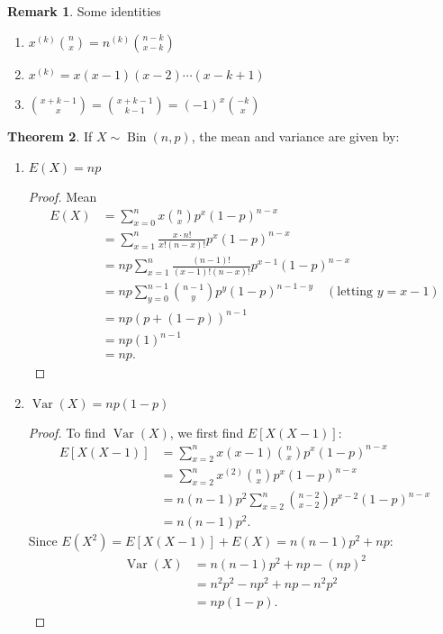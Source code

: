 \documentclass[12pt,a4paper]{report}
\theoremstyle{definition}
\newtheorem{thm}{Theorem}[section]
\newtheorem{remark}[thm]{Remark}
\theoremstyle{plain}
\theoremstyle{definition}
\begin{document}
\begin{remark}
Some identities
\begin{enumerate}
\item $x^{(k)}\binom{n}{x} = n^{(k)}\binom{n-k}{x-k}$
\item $x^{(k)} = x(x - 1)(x - 2) \cdots (x - k + 1)$
\item $\binom{x + k - 1}{x} = \binom{x + k - 1}{k - 1} = (-1)^x\binom{-k}{x}$
\end{enumerate}
\end{remark}






\begin{thm}
If $X \sim \operatorname{Bin}(n, p)$, the mean and variance are given by:
\begin{enumerate}
\item $E(X) = np$
\begin{proof}
Mean 
\begin{align*} 
E(X) &= \sum_{x=0}^n x \binom{n}{x} p^x (1-p)^{n-x}\\
& = \sum_{x=1}^n \frac{x \cdot n!}{x!(n-x)!} p^x (1-p)^{n-x}\\ 
& = np \sum_{x=1}^n \frac{(n-1)!}{(x-1)!(n-x)!} p^{x-1} (1-p)^{n-x}\\ 
& = np \sum_{y=0}^{n-1} \binom{n-1}{y} p^y (1-p)^{n-1-y} \quad (\text{letting } y = x-1)\\ 
& = np(p + (1-p))^{n-1}\\
& = np(1)^{n-1}\\
& = np. 
\end{align*}
\end{proof}


\item $\operatorname{Var}(X) = np(1-p)$
\begin{proof}
To find $\operatorname{Var}(X)$, we first find $E[X(X-1)]$:
\begin{align*}
E[X(X-1)] &= \sum_{x=2}^n x(x-1) \binom{n}{x} p^x (1-p)^{n-x}\\
&= \sum_{x=2}^n x^{(2)} \binom{n}{x} p^x (1-p)^{n-x}\\
&= n(n-1)p^2 \sum_{x=2}^n \binom{n-2}{x-2} p^{x-2} (1-p)^{n-x}\\
& = n(n-1)p^2.
\end{align*}
Since $E(X^2) = E[X(X-1)] + E(X) = n(n-1)p^2 + np$:
\begin{align*}
\operatorname{Var}(X) &= n(n-1)p^2 + np - (np)^2\\
& = n^2p^2 - np^2 + np - n^2p^2\\
& = np(1-p).
\end{align*}
\end{proof}
\end{enumerate}
\end{thm}
\end{document}
